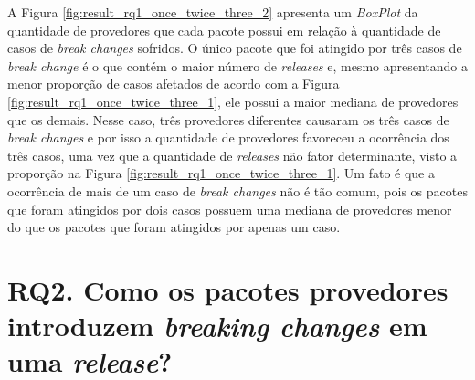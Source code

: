 A Figura \ref{fig:result_rq1_once_twice_three_2} apresenta um \textit{BoxPlot} da quantidade de provedores que cada pacote possui em relação à quantidade de casos de \textit{break changes} sofridos. O único pacote que foi atingido por três casos de \textit{break change} é o que contém o maior número de \textit{releases} e, mesmo apresentando a menor proporção de casos afetados de acordo com a Figura \ref{fig:result_rq1_once_twice_three_1}, ele possui a maior mediana de provedores que os demais. Nesse caso, três provedores diferentes causaram os três casos de \textit{break changes} e por isso a quantidade de provedores favoreceu a ocorrência dos três casos, uma vez que a quantidade de \textit{releases} não fator determinante, visto a proporção na Figura \ref{fig:result_rq1_once_twice_three_1}. Um fato é que a ocorrência de mais de um caso de \textit{break changes} não é tão comum, pois os pacotes que foram atingidos por dois casos possuem uma mediana de provedores menor do que os pacotes que foram atingidos por apenas um caso.

\section{RQ2. Como os pacotes provedores introduzem \textit{breaking changes} em uma \textit{release}?}
\label{sec:rq2}

